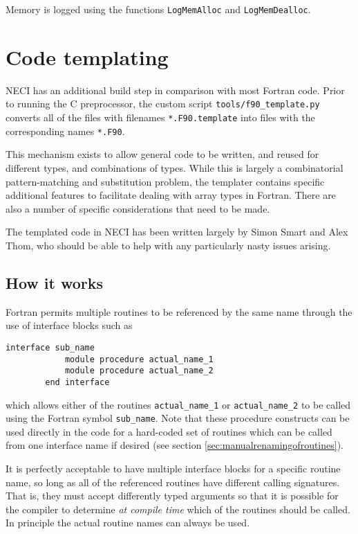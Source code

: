 \documentclass[a4paper,notitlepage]{scrreprt}
\let\code\lstinline
\begin{document}
	Memory is logged using the functions \code{LogMemAlloc} and
	\code{LogMemDealloc}.



\section{Code templating}
\label{sect:templating}
	NECI has an additional build step in comparison with most Fortran code.
	Prior to running the C preprocessor, the custom script
	\code{tools/f90_template.py} converts all of the files with filenames
	\code{*.F90.template} into files with the corresponding names
	\code{*.F90}.

	This mechanism exists to allow general code to be written, and reused for
	different types, and combinations of types. While this is largely a
	combinatorial pattern-matching and substitution problem, the templater
	contains specific additional features to facilitate dealing with array
	types in Fortran. There are also a number of specific considerations that
	need to be made.

	The templated code in NECI has been written largely by Simon Smart and Alex
	Thom, who should be able to help with any particularly nasty issues
	arising.

\subsection{How it works}
	Fortran permits multiple routines to be referenced by the same name through
	the use of interface blocks such as
	\begin{lstlisting}[gobble=4]
		interface sub_name
			module procedure actual_name_1
			module procedure actual_name_2
		end interface
	\end{lstlisting}
	which allows either of the routines \code{actual_name_1} or
	\code{actual_name_2} to be called using the Fortran symbol
	\code{sub_name}. Note that these procedure constructs can be used directly in the code
	for a hard-coded set of routines which can be called from one interface name if desired (see section \ref{sec:manualrenamingofroutines}).

	It is perfectly acceptable to have multiple interface blocks for a specific
	routine name, so long as all of the referenced routines have different
	calling signatures. That is, they must accept differently typed arguments
	so that it is possible for the compiler to determine \emph{at compile time}
	which of the routines should be called. In principle the actual routine
	names can always be used.
\end{document}
